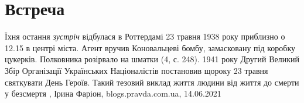  
 
 
 
 
\chapter{Встреча}
\label{sec:slova.vstrecha}

Їхня остання \emph{зустріч} відбулася в Роттердамі 23 травня 1938 року
приблизно о 12.15 в центрі міста. Агент вручив Коновальцеві бомбу, замасковану
під коробку цукерків. Полковника розірвало на шматки (4, с. 248).  1941 року
Другий Великий Збір Організації Українських Націоналістів постановив щороку 23
травня святкувати День Героїв. Такий тезовий виклад життя людини від життя до
смерти у безсмертя
, 
Ірина Фаріон, blogs.pravda.com.ua, 14.06.2021

